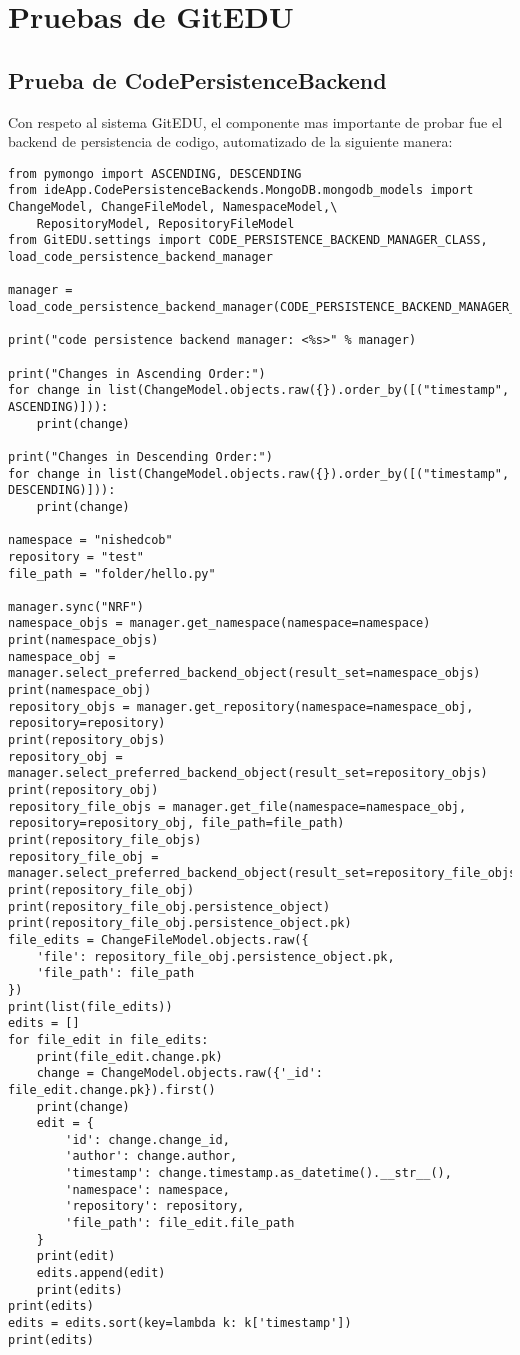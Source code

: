 
\chapter{Pruebas de GitEDU}
\label{AnexoF}

\section{Prueba de CodePersistenceBackend}
Con respeto al sistema GitEDU, el componente mas importante de probar fue el backend de persistencia de codigo, automatizado de la siguiente manera:
\lstset{language=Python}
\begin{lstlisting}[breaklines]
from pymongo import ASCENDING, DESCENDING
from ideApp.CodePersistenceBackends.MongoDB.mongodb_models import ChangeModel, ChangeFileModel, NamespaceModel,\
    RepositoryModel, RepositoryFileModel
from GitEDU.settings import CODE_PERSISTENCE_BACKEND_MANAGER_CLASS, load_code_persistence_backend_manager

manager = load_code_persistence_backend_manager(CODE_PERSISTENCE_BACKEND_MANAGER_CLASS)

print("code persistence backend manager: <%s>" % manager)

print("Changes in Ascending Order:")
for change in list(ChangeModel.objects.raw({}).order_by([("timestamp", ASCENDING)])):
    print(change)

print("Changes in Descending Order:")
for change in list(ChangeModel.objects.raw({}).order_by([("timestamp", DESCENDING)])):
    print(change)

namespace = "nishedcob"
repository = "test"
file_path = "folder/hello.py"

manager.sync("NRF")
namespace_objs = manager.get_namespace(namespace=namespace)
print(namespace_objs)
namespace_obj = manager.select_preferred_backend_object(result_set=namespace_objs)
print(namespace_obj)
repository_objs = manager.get_repository(namespace=namespace_obj, repository=repository)
print(repository_objs)
repository_obj = manager.select_preferred_backend_object(result_set=repository_objs)
print(repository_obj)
repository_file_objs = manager.get_file(namespace=namespace_obj, repository=repository_obj, file_path=file_path)
print(repository_file_objs)
repository_file_obj = manager.select_preferred_backend_object(result_set=repository_file_objs)
print(repository_file_obj)
print(repository_file_obj.persistence_object)
print(repository_file_obj.persistence_object.pk)
file_edits = ChangeFileModel.objects.raw({
    'file': repository_file_obj.persistence_object.pk,
    'file_path': file_path
})
print(list(file_edits))
edits = []
for file_edit in file_edits:
    print(file_edit.change.pk)
    change = ChangeModel.objects.raw({'_id': file_edit.change.pk}).first()
    print(change)
    edit = {
        'id': change.change_id,
        'author': change.author,
        'timestamp': change.timestamp.as_datetime().__str__(),
        'namespace': namespace,
        'repository': repository,
        'file_path': file_edit.file_path
    }
    print(edit)
    edits.append(edit)
    print(edits)
print(edits)
edits = edits.sort(key=lambda k: k['timestamp'])
print(edits)
\end{lstlisting}
